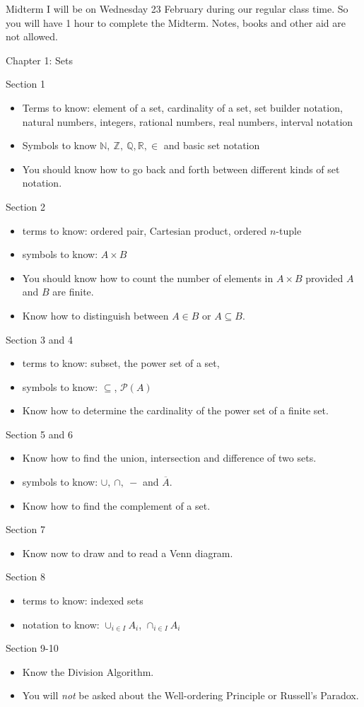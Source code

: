\documentclass[12pt]{article}
\def\RR{{\mathbb R}}
\def\NN{{\mathbb N}}
\def\ZZ{{\mathbb Z}}
\def\QQ{{\mathbb Q}}
\begin{document}
\thispagestyle{fancy}

Midterm I will be on Wednesday 23 February during our regular class time. So you will have 1 hour to complete the Midterm. Notes, books and other aid are not allowed.\\

\begin{center} Chapter 1: Sets\end{center}
Section 1
\begin{itemize}
\item Terms to know: element of a set, cardinality of a set, set builder notation, natural numbers, integers, rational numbers, real numbers, interval notation
\item Symbols to know $\NN,\: \ZZ,\: \QQ, \RR, \in$ and basic set notation
\item You should know how to go back and forth between different kinds of set notation.
\end{itemize}
Section 2
\begin{itemize}
\item terms to know: ordered pair, Cartesian product, ordered $n$-tuple
\item symbols to know: $A \times B$
\item You should know how to count the number of elements in $A \times B$ provided $A$ and $B$ are finite.
\item Know how to distinguish between $A \in B$ or $A \subseteq B.$
\end{itemize}
Section 3 and 4
\begin{itemize}
\item terms to know: subset, the power set of a set,
\item symbols to know: $\subseteq$, $\mathcal{P}(A)$
\item Know how to determine the cardinality of the power set of a finite set.
\end{itemize}
Section 5 and 6
\begin{itemize}
\item Know how to find the union, intersection and difference of two sets.
\item symbols to know: $\cup, \: \cap, \: -$ and $\overline{A}$.
\item Know how to find the complement of a set.
\end{itemize}
Section 7
\begin{itemize}
\item Know now to draw and to read a Venn diagram.
\end{itemize}
Section 8
\begin{itemize}
\item terms to know: indexed sets
\item notation to know: $\cup_{i \in I} A_i$, $\cap_{i \in I} A_i$
\end{itemize}
Section 9-10
\begin{itemize}
\item Know the Division Algorithm.
\item You will \emph{not} be asked about the Well-ordering Principle or Russell's Paradox.
\end{itemize}
\end{document}
